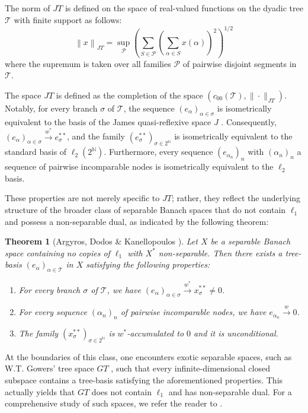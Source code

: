 \documentclass[12pt]{amsart}
\theoremstyle{plain}
\numberwithin{equation}{section}
\newcommand{\N}{\mathbb{N}}
\newcommand{\norm}[1]{\left\lVert#1\right\rVert}
\newcommand{\s}{\sigma}
\newcommand{\Tree}{\mathcal{T}}
\newtheorem{theorem}{Theorem}[section]
\begin{document}
The norm of $JT$ is defined on the space of real-valued functions on the dyadic tree $\Tree$ with finite support as follows:
\[ \norm{x}_{JT} = \sup_{\mathcal{P}} \left( \sum_{S \in \mathcal{P}} \left( \sum_{\alpha \in S} x(\alpha) \right)^2 \right)^{1/2} \]
where the supremum is taken over all families $\mathcal{P}$ of pairwise disjoint segments in $\Tree$.

The space $JT$ is defined as the completion of the space $(c_{00} (\Tree), \| \cdot\|_{JT} )$. Notably, for every branch $\s$ of $\Tree$, the sequence $(e_\alpha)_{\alpha \in \s}$ is isometrically equivalent to the basis of the James quasi-reflexive space $J$ \cite{James:51}. Consequently, $(e_\alpha)_{\alpha\in \s} \xrightarrow{w^*} e_\s^{**}$, and the family $(e_\s^{**})_{\s \in 2^\N}$ is isometrically equivalent to the standard basis of $\ell_2(2^\N)$. Furthermore, every sequence $(e_{\alpha_n})_n$ with $(\alpha_n)_n$ a sequence  of pairwise incomparable nodes is isometrically equivalent to the $\ell_2$ basis.

These properties are not merely specific to $JT$; rather, they reflect the underlying structure of the broader class of separable Banach spaces that do not contain $\ell_1$ and possess a non-separable dual, as indicated by the following theorem:

\begin{theorem}[Argyros, Dodos \& Kanellopoulos \cite{ADK}]
Let $X$ be a separable Banach space containing no copies of $\ell_1$ with $X^*$ non-separable. Then there exists a tree-basis $(e_\alpha)_{\alpha\in \Tree}$ in $X$ satisfying the following properties:
\begin{enumerate}
    \item For every branch $\s$ of $\Tree$, we have $(e_{\alpha})_{\alpha \in \s} \xrightarrow{w^*} x_\s^{**} \ne 0$.
    \item For every sequence $(\alpha_n)_n$ of pairwise incomparable nodes, we have $e_{\alpha_n} \xrightarrow{w} 0$.
    \item The family $(x_\s^{**})_{\s \in 2^\N}$ is $w^*$-accumulated to $0$ and it is unconditional.
\end{enumerate}
\end{theorem}

At the boundaries of this class, one encounters exotic separable spaces, such as W.T. Gowers' tree space $GT$  \cite{G}, such that every infinite-dimensional closed subspace contains a tree-basis satisfying the aforementioned properties. This actually yields that $GT$ does not contain $\ell_1$ and has non-separable dual. For a comprehensive study of such spaces, we refer the reader to \cite{AAT}.
\end{document}
